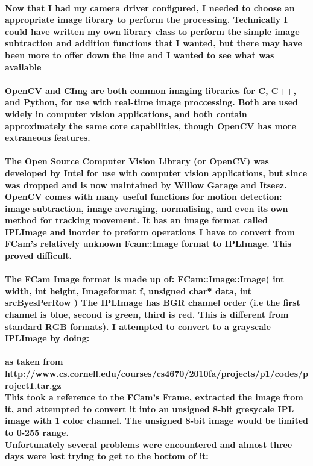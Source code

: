 \documentclass[11pt]{article} %
\begin{document}
\paragraph{Now that I had my camera driver configured, I needed to choose an appropriate image library to perform the processing. Technically I could have written my own library class to perform the simple image subtraction and addition functions that I wanted, but there may have been more to offer down the line and I wanted to see what was available}
\paragraph{OpenCV and CImg are both common imaging libraries for C, C++, and Python, for use with real-time image proccessing. 
Both are used widely in computer vision applications, and both contain approximately the same core capabilities, though OpenCV has more extraneous features.}
\paragraph{The Open Source Computer Vision Library (or OpenCV) was developed by Intel for use with computer vision applications, but since was dropped and is now maintained by Willow Garage and Itseez.
\\OpenCV comes with many useful functions for motion detection: image subtraction, image averaging, normalising, and even its own method for tracking movement. It has an image format called IPLImage and inorder to preform operations I have to convert from FCam's relatively unknown Fcam::Image format to IPLImage. This proved difficult.
}
\paragraph{The FCam Image format is made up of:
FCam::Image::Image(
     int width,
     int height,
     Imageformat f,
     unsigned char* data,
     int srcByesPerRow
)
The IPLImage has BGR channel order (i.e the first channel is blue, second is green, third is red. This is different from standard RGB formats). I attempted to convert to a grayscale IPLImage by doing:}
\begin{frame}[fragile]

\end{frame}
\paragraph{as taken from http://www.cs.cornell.edu/courses/cs4670/2010fa/projects/p1/codes/project1.tar.gz\\
This took a reference to the FCam's Frame, extracted the image from it, and attempted to convert it into an unsigned 8-bit gresycale IPL image with 1 color channel. The unsigned 8-bit image would be limited to 0-255 range.\\
Unfortunately several problems were encountered and almost three days were lost trying to get to the bottom of it:}
\end{document}
